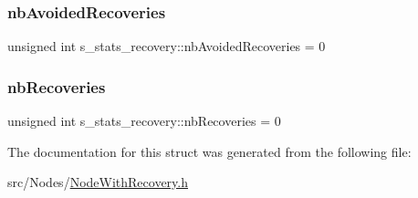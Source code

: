 \subsubsection{\texorpdfstring{nb\+Avoided\+Recoveries}{nbAvoidedRecoveries}}
{\footnotesize\ttfamily unsigned int s\+\_\+stats\+\_\+recovery\+::nb\+Avoided\+Recoveries = 0}

\mbox{\label{structs__stats__recovery_a89b2e116cf913c2939d186a2cd4f865b}} 
\subsubsection{\texorpdfstring{nb\+Recoveries}{nbRecoveries}}
{\footnotesize\ttfamily unsigned int s\+\_\+stats\+\_\+recovery\+::nb\+Recoveries = 0}



The documentation for this struct was generated from the following file\+:\begin{DoxyCompactItemize}
\item 
src/\+Nodes/\hyperlink{_node_with_recovery_8h}{Node\+With\+Recovery.\+h}\end{DoxyCompactItemize}
